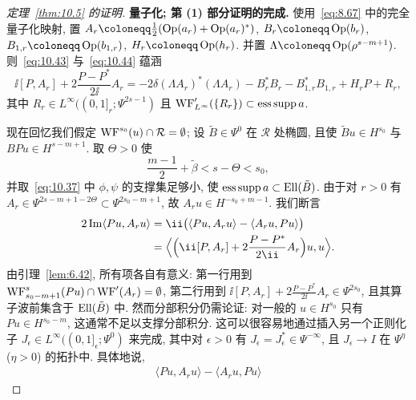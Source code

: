 \begin{proof}[定理~\ref{thm:10.5} 的证明]
\medskip\noindent\textbf{量子化; 第 (1) 部分证明的完成.} 使用~\eqref{eq:8.67} 中的完全量子化映射, 置 $A_r \defeq \frac{1}{2}(\operatorname{Op}(a_r) + \operatorname{Op}(a_r)^*)$, $B_r \defeq \operatorname{Op}(b_r)$, $B_{1,r} \defeq \operatorname{Op}(b_{1,r})$, $H_r \defeq \operatorname{Op}(h_r)$. 并置 $\Lambda \defeq \operatorname{Op}(\rho^{s-m+1})$. 则~\eqref{eq:10.43} 与~\eqref{eq:10.44} 蕴涵
\begin{equation}\label{eq:10.45}
    \ii[P, A_r] + 2\frac{P - P^*}{2\ii}A_r = -2\delta(\Lambda A_r)^*(\Lambda A_r) - B_r^* B_r - B_{1,r}^* B_{1,r} + H_r P + R_r,
\end{equation}
其中 $R_r \in L^\infty((0,1]_r; \Psi^{2s-1})$ 且 $\operatorname{WF}_{L^\infty}'(\{R_r\}) \subset \operatorname{ess\,supp} a$.

现在回忆我们假定 $\operatorname{WF}^{s_0}(u) \cap \mathcal{R} = \emptyset$; 设 $\tilde{B} \in \Psi^0$ 在 $\mathcal{R}$ 处椭圆, 且使 $\tilde{B}u \in H^{s_0}$ 与 $B P u \in H^{s-m+1}$. 取 $\Theta > 0$ 使
\begin{equation}\label{eq:10.46}
    \frac{m-1}{2} + \tilde{\beta} < s - \Theta < s_0,
\end{equation}
并取~\eqref{eq:10.37} 中 $\phi, \psi$ 的支撑集足够小, 使 $\operatorname{ess\,supp} a \subset \operatorname{Ell}(\tilde{B})$. 由于对 $r > 0$ 有 $A_r \in \Psi^{2s-m+1-2\Theta} \subset \Psi^{2s_0-m+1}$, 故 $A_r u \in H^{-s_0+m-1}$. 我们断言
\begin{equation}\label{eq:10.47}
    \begin{aligned}
        2\operatorname{Im}\langle P u, A_r u \rangle &= \ii\bigl(\langle P u, A_r u \rangle - \langle A_r u, P u \rangle\bigr) \\
        &= \Bigl\langle \Bigl(\ii[P, A_r] + 2\frac{P - P^*}{2\ii}A_r\Bigr)u, u \Bigr\rangle.
    \end{aligned}
\end{equation}
由引理~\ref{lem:6.42}, 所有项各自有意义: 第一行用到 $\operatorname{WF}_{s_0-m+1}^{s}(P u) \cap \operatorname{WF}'(A_r) = \emptyset$, 第二行用到 $\ii[P, A_r] + 2\frac{P-P^*}{2\ii}A_r \in \Psi^{2s_0}$, 且其算子波前集含于 $\operatorname{Ell}(\tilde{B})$ 中. 然而分部积分仍需论证: 对一般的 $u \in H^{s_0}$ 只有 $P u \in H^{s_0-m}$, 这通常不足以支撑分部积分. 这可以很容易地通过插入另一个正则化子 $J_\epsilon \in L^\infty((0,1]_\epsilon; \Psi^0)$ 来完成, 其中对 $\epsilon > 0$ 有 $J_\epsilon = J_\epsilon^* \in \Psi^{-\infty}$, 且 $J_\epsilon \to I$ 在 $\Psi^\eta$ ($\eta > 0$) 的拓扑中. 具体地说,
\begin{equation}\label{eq:10.48}
    \begin{aligned}
        \langle P u, A_r u \rangle - \langle A_r u, P u \rangle

\end{aligned}
\end{equation}
\end{proof}
